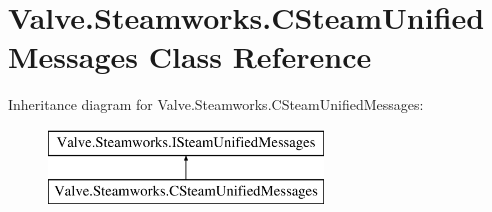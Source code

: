 \hypertarget{classValve_1_1Steamworks_1_1CSteamUnifiedMessages}{}\section{Valve.\+Steamworks.\+C\+Steam\+Unified\+Messages Class Reference}
\label{classValve_1_1Steamworks_1_1CSteamUnifiedMessages}
Inheritance diagram for Valve.\+Steamworks.\+C\+Steam\+Unified\+Messages\+:\begin{figure}[H]
\begin{center}
\leavevmode
\includegraphics[height=2.000000cm]{classValve_1_1Steamworks_1_1CSteamUnifiedMessages}
\end{center}
\end{figure}
